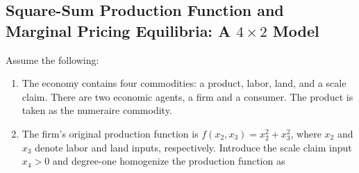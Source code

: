 \documentclass[
  letterpaper,
  DIV=11,
  numbers=noendperiod]{scrreprt}
\newenvironment{Shaded}{\begin{snugshade}}{\end{snugshade}}
\newcommand{\ConstantTok}[1]{\textcolor[rgb]{0.56,0.35,0.01}{#1}}
\newcommand{\FloatTok}[1]{\textcolor[rgb]{0.68,0.00,0.00}{#1}}
\newcommand{\FunctionTok}[1]{\textcolor[rgb]{0.28,0.35,0.67}{#1}}
\newcommand{\NormalTok}[1]{\textcolor[rgb]{0.00,0.23,0.31}{#1}}
\newcommand{\OperatorTok}[1]{\textcolor[rgb]{0.37,0.37,0.37}{#1}}
\newcommand{\SpecialCharTok}[1]{\textcolor[rgb]{0.37,0.37,0.37}{#1}}
\newcommand{\StringTok}[1]{\textcolor[rgb]{0.13,0.47,0.30}{#1}}
\begin{document}
%

\subsection{\texorpdfstring{Square-Sum Production Function and Marginal
Pricing Equilibria: A \(4\times2\)
Model}{Square-Sum Production Function and Marginal Pricing Equilibria: A 4\textbackslash times2 Model}}\label{square-sum-production-function-and-marginal-pricing-equilibria-a-4times2-model}

Assume the following:

\begin{enumerate}
\def\labelenumi{\arabic{enumi}.}
\item
  The economy contains four commodities: a product, labor, land, and a
  scale claim. There are two economic agents, a firm and a consumer. The
  product is taken as the numeraire commodity.
\item
  The firm's original production function is \(f(x_2,x_3)=x_2^2+x_3^2\),
  where \(x_2\) and \(x_3\) denote labor and land inputs, respectively.
  Introduce the scale claim input \(x_4>0\) and degree-one homogenize
  the production function as
\end{enumerate}
\end{document}
